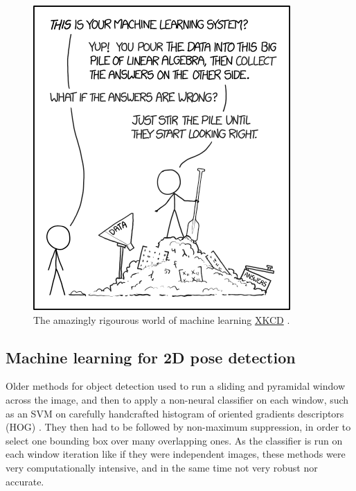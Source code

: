 \begin{figure}[hbtp]
	\centering
	\def\svgwidth{1\columnwidth}
	\fontsize{10pt}{10pt}\selectfont
	\includegraphics[width=0.4\linewidth]{"../Chap2/Figures/Fig_XKCD.png"}
	\caption{The amazingly rigourous world of machine learning \href{https://xkcd.com/1838/}{XKCD} .} 
	\label{fig_xkcd}
\end{figure}


\subsection{Machine learning for 2D pose detection}\label{sec:Machine learning for 2D pose detection}

Older methods for object detection used to run a sliding and pyramidal window across the image, and then to apply a non-neural classifier on each window, such as an SVM on carefully handcrafted histogram of oriented gradients descriptors (HOG) \cite{Dalal2005}. They then had to be followed by non-maximum suppression, in order to select one bounding box over many overlapping ones. As the classifier is run on each window iteration like if they were independent images, these methods were very computationally intensive, and in the same time not very robust nor accurate. 

